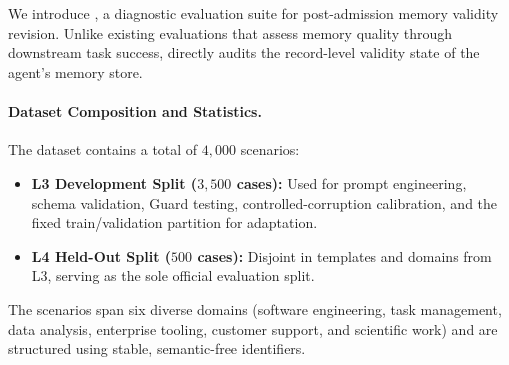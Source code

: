 \section{\bench{}}

We introduce \bench{}, a diagnostic evaluation suite for post-admission memory validity revision. Unlike existing evaluations that assess memory quality through downstream task success, \bench{} directly audits the record-level validity state of the agent's memory store.

\paragraph{Dataset Composition and Statistics.}
The dataset contains a total of $4,000$ scenarios:
\begin{itemize}[leftmargin=*]
\item \textbf{L3 Development Split ($3,500$ cases):} Used for prompt engineering, schema validation, Guard testing, controlled-corruption calibration, and the fixed train/validation partition for adaptation.
\item \textbf{L4 Held-Out Split ($500$ cases):} Disjoint in templates and domains from L3, serving as the sole official evaluation split.
\end{itemize}
The scenarios span six diverse domains (software engineering, task management, data analysis, enterprise tooling, customer support, and scientific work) and are structured using stable, semantic-free identifiers.

